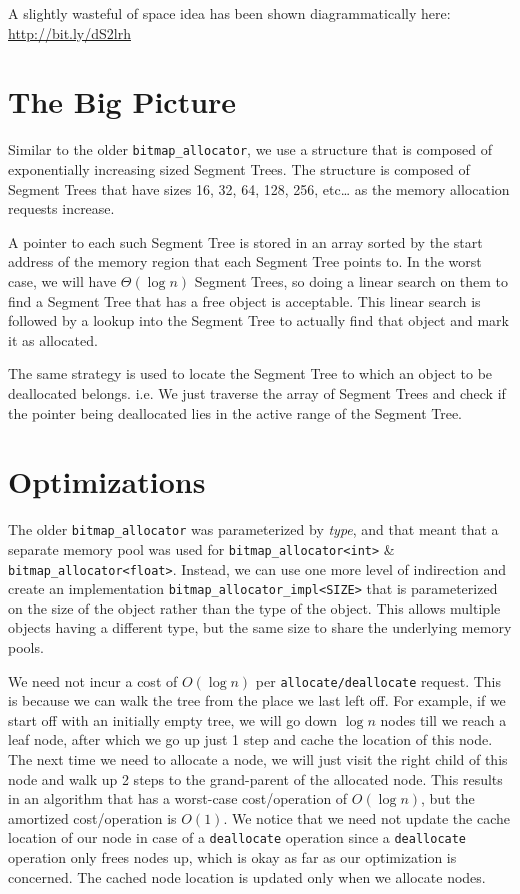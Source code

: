 \documentclass{article}
\begin{document}
A slightly wasteful of space idea has been shown diagrammatically
here:\\
\url{http://bit.ly/dS2lrh}

\section{The Big Picture}

Similar to the older \texttt{bitmap\_allocator}, we use a structure
that is composed of exponentially increasing sized Segment Trees. The
structure is composed of Segment Trees that have sizes 16, 32, 64,
128, 256, etc\ldots{} as the memory allocation requests increase.

A pointer to each such Segment Tree is stored in an array sorted by
the start address of the memory region that each Segment Tree points
to. In the worst case, we will have $\Theta(\log{n})$ Segment Trees,
so doing a linear search on them to find a Segment Tree that has a
free object is acceptable. This linear search is followed by a lookup
into the Segment Tree to actually find that object and mark it as
allocated.

The same strategy is used to locate the Segment Tree to which an
object to be deallocated belongs. i.e. We just traverse the array of
Segment Trees and check if the pointer being deallocated lies in the
active range of the Segment Tree.

\section{Optimizations}

The older \texttt{bitmap\_allocator} was parameterized by
\textit{type}, and that meant that a separate memory pool was used for
\texttt{bitmap\_allocator<int>} \&
\texttt{bitmap\_allocator<float>}. Instead, we can use one more level
of indirection and create an implementation
\texttt{bitmap\_allocator\_impl<SIZE>} that is parameterized on the
size of the object rather than the type of the object. This allows
multiple objects having a different type, but the same size to share
the underlying memory pools.

We need not incur a cost of $O(\log{n})$ per
\texttt{allocate/deallocate} request. This is because we can walk the
tree from the place we last left off. For example, if we start off
with an initially empty tree, we will go down $\log{n}$ nodes till we
reach a leaf node, after which we go up just 1 step and cache the
location of this node. The next time we need to allocate a node, we
will just visit the right child of this node and walk up 2 steps to
the grand-parent of the allocated node. This results in an algorithm
that has a worst-case cost/operation of $O(\log{n})$, but the
amortized cost/operation is $O(1)$. We notice that we need not update
the cache location of our node in case of a \texttt{deallocate}
operation since a \texttt{deallocate} operation only frees nodes up,
which is okay as far as our optimization is concerned. The cached node
location is updated only when we allocate nodes.
\end{document}
